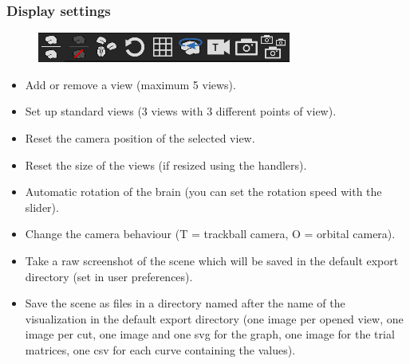 \documentclass[a4paper]{article}
\begin{document}
\subsubsection{Display settings}
\begin{figure}[H]
\begin{center}
\includegraphics[scale=0.45]{DisplaySettings.png}
\end{center}
\end{figure}
\begin{itemize}
\item Add or remove a view (maximum 5 views).
\item Set up standard views (3 views with 3 different points of view).
\item Reset the camera position of the selected view.
\item Reset the size of the views (if resized using the handlers).
\item Automatic rotation of the brain (you can set the rotation speed with the slider).
\item Change the camera behaviour (T = trackball camera, O = orbital camera).
\item Take a raw screenshot of the scene which will be saved in the default export directory (set in user preferences).
\item Save the scene as files in a directory named after the name of the visualization in the default export directory (one image per opened view, one image per cut, one image and one svg for the graph, one image for the trial matrices, one csv for each curve containing the values).
\end{itemize}
\end{document}
